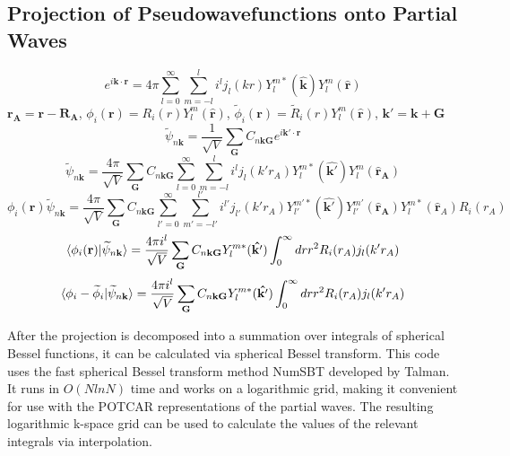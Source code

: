 \documentclass[12pt]{article}
\begin{document}
\subsection{Projection of Pseudowavefunctions onto Partial Waves}

\begin{equation}
e^{i\mathbf{k} \cdot \mathbf{r}} = 4\pi \sum_{l=0}^{\infty}\sum_{m=-l}^{l}
i^l j_l(kr)Y_l^{m*}(\mathbf{\hat{k}})Y_l^m(\mathbf{\hat{r}})
\label{eq:pwexp}
\end{equation}
$\mathbf{r_A} = \mathbf{r} - \mathbf{R_A}$, $\phi_i(\mathbf{r})=R_i(r)Y_l^m(\mathbf{\hat{r}})$,
$\widetilde{\phi}_i(\mathbf{r})=\widetilde{R}_i(r)Y_l^m(\mathbf{\hat{r}})$,
$\mathbf{k'}=\mathbf{k}+\mathbf{G}$\\
$$\widetilde{\psi}_{n\mathbf{k}}=\frac{1}{\sqrt{V}}\sum_{\mathbf{G}}
C_{n\mathbf{k}\mathbf{G}}e^{i\mathbf{k'}\cdot \mathbf{r}}$$
$$\widetilde{\psi}_{n\mathbf{k}}=\frac{4\pi}{\sqrt{V}}\sum_{\mathbf{G}}
C_{n\mathbf{k}\mathbf{G}}\sum_{l=0}^{\infty}\sum_{m=-l}^{l}
i^l j_l(k'r_A)Y_l^{m*}(\mathbf{\hat{k'}})Y_l^m(\mathbf{\hat{r}_A})$$
$$\phi_i(\mathbf{r})\widetilde{\psi}_{n\mathbf{k}}=\frac{4\pi}{\sqrt{V}}\sum_{\mathbf{G}}
C_{n\mathbf{k}\mathbf{G}}\sum_{l'=0}^{\infty}\sum_{m'=-l'}^{l'}
i^{l'} j_{l'}(k'r_A)Y_{l'}^{m'*}(\mathbf{\hat{k'}})Y_{l'}^{m'}(\mathbf{\hat{r}_A})
Y_l^{m*}(\mathbf{\hat{r}}_A)R_i(r_A)$$
$$\braket{\phi_i(\mathbf{r})|\widetilde{\psi}_{n\mathbf{k}}}=
\frac{4\pi i^l}{\sqrt{V}}\sum_{\mathbf{G}} C_{n\mathbf{k}\mathbf{G}}
Y_l^{m*}(\mathbf{\hat{k'}})\int_0^{\infty}drr^2R_i(r_A)j_l(k'r_A)$$
$$\braket{\phi_i-\widetilde{\phi}_i|\widetilde{\psi}_{n\mathbf{k}}}=
\frac{4\pi i^l}{\sqrt{V}}\sum_{\mathbf{G}} C_{n\mathbf{k}\mathbf{G}}
Y_l^{m*}(\mathbf{\hat{k'}})\int_0^{\infty}drr^2R_i(r_A)j_l(k'r_A)$$

After the projection is decomposed into a summation over integrals of spherical
Bessel functions, it can be calculated via spherical Bessel transform. This code
uses the fast spherical Bessel transform method NumSBT developed by Talman.\cite{TALMAN}
It runs in $O(NlnN)$ time and works on a logarithmic grid, making it convenient for use with
the POTCAR representations of the partial waves. The resulting logarithmic k-space
grid can be used to calculate the values of the relevant integrals via interpolation.
\end{document}
